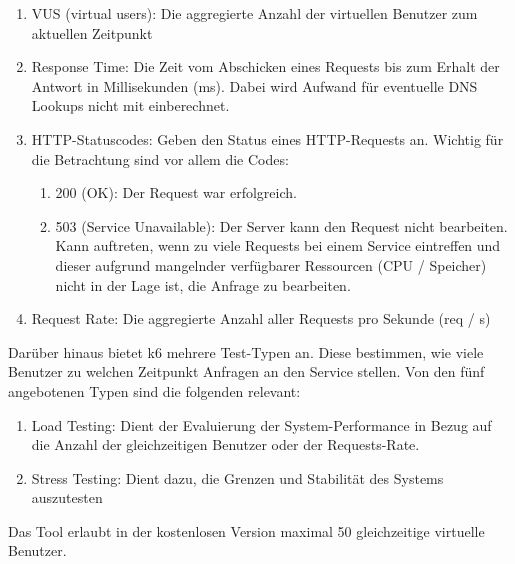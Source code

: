 \begin{enumerate}
    \item VUS (virtual users): Die aggregierte Anzahl der virtuellen Benutzer zum aktuellen Zeitpunkt 
    
    \item Response Time: Die Zeit vom Abschicken eines Requests bis zum Erhalt der Antwort in Millisekunden (ms). Dabei wird Aufwand für eventuelle DNS Lookups nicht mit einberechnet.
    
    \item HTTP-Statuscodes: Geben den Status eines HTTP-Requests an. Wichtig für die Betrachtung sind vor allem die Codes:
        \begin{enumerate}
            \item 200 (OK): Der Request war erfolgreich.
            \item 503 (Service Unavailable): Der Server kann den Request nicht bearbeiten. Kann auftreten, wenn zu viele Requests bei einem Service eintreffen und dieser aufgrund mangelnder verfügbarer Ressourcen (CPU / Speicher) nicht in der Lage ist, die Anfrage zu bearbeiten.
        \end{enumerate}
        
    \item Request Rate: Die aggregierte Anzahl aller Requests pro Sekunde (req / s)
\end{enumerate}

Darüber hinaus bietet k6 mehrere Test-Typen an. Diese bestimmen, wie viele Benutzer zu welchen Zeitpunkt Anfragen an den Service stellen. Von den fünf angebotenen Typen sind die folgenden relevant:
\begin{enumerate}
    \item Load Testing: Dient der Evaluierung der System-Performance in Bezug auf die Anzahl der gleichzeitigen Benutzer oder der Requests-Rate.
    
    \item Stress Testing: Dient dazu, die Grenzen und Stabilität des Systems auszutesten
\end{enumerate}

Das Tool erlaubt in der kostenlosen Version maximal 50 gleichzeitige virtuelle Benutzer. 